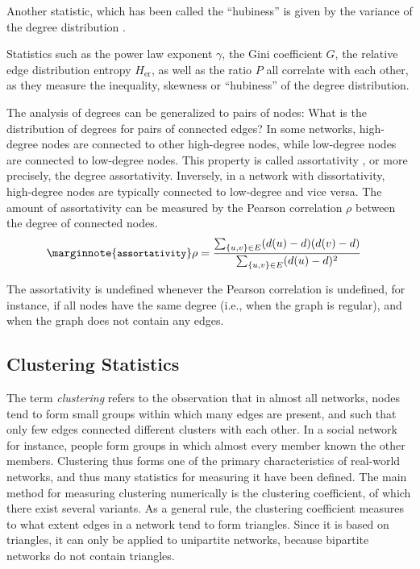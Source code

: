 \documentclass{article}
\begin{document}
Another statistic, which has been called the ``hubiness'' is given by
the variance of the degree distribution \cite[e.g. by][]{b883,b884}.

Statistics such as the power law exponent $\gamma$, the Gini coefficient
$G$, the relative edge distribution entropy $H_{\mathrm{er}}$, as well
as the ratio $P$ all correlate with each other, as they measure the
inequality, skewness or ``hubiness'' of the degree distribution. 

The analysis of degrees can be generalized to pairs of nodes:  What is
the distribution of degrees for pairs of connected edges?  In some
networks, high-degree nodes are connected to other high-degree nodes,
while low-degree nodes are connected to low-degree nodes.  This property
is called assortativity \citep{b854}, or more precisely, the degree
assortativity.  Inversely, in a network with dissortativity,  
high-degree nodes are typically connected to low-degree and vice versa.
The amount of assortativity can be measured by the Pearson correlation
$\rho$ between the degree of connected nodes.  
\begin{align}
  \marginnote{\texttt{\small assortativity}} \rho &= \frac
  {\sum_{\{u,v\} \in E} (d(u) - d)(d(v) - d)}
  {\sum_{\{u,v\} \in E} (d(u) - d)^2}
\end{align}

The assortativity is
undefined whenever the Pearson correlation is undefined, for instance,
if all nodes have the same degree (i.e., when the graph is regular), and
when the graph does not contain any edges. 

\subsection{Clustering Statistics}
\label{sec:statistic:clustering}

The term \emph{clustering} refers to the observation that in almost all
networks, nodes tend to form small groups within which many edges are
present, and such that only few edges connected different clusters with
each other.  In a social network for instance, people form groups in
which almost every member known the other members.  Clustering thus
forms one of the primary characteristics of real-world networks, and
thus many statistics for measuring it have been defined.  The main
method for measuring clustering numerically is the clustering
coefficient, of which there exist several variants. As a general rule,
the clustering coefficient measures to what extent edges in a network
tend to form triangles. Since it is based on triangles, it can only be
applied to unipartite networks, because bipartite networks do not
contain triangles.
\end{document}
